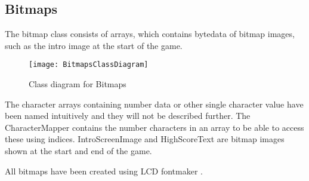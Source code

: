 \subsection{Bitmaps}
	The bitmap class consists of arrays, which contains bytedata of bitmap images, such as the intro image at the start of the game. 
	
	\begin{figure}[H]
		\texttt{[image: BitmapsClassDiagram]}
		\centering
		\caption{Class diagram for Bitmaps}
		\label{fig:classBitmap}
	\end{figure}
	
	The character arrays containing number data or other single character value have been named intuitively and they will not be described further. The CharacterMapper contains the number characters in an array to be able to access these using indices. IntroScreenImage and HighScoreText are bitmap images shown at the start and end of the game.
	
	All bitmaps have been created using LCD fontmaker \cite{FontMaker}. 